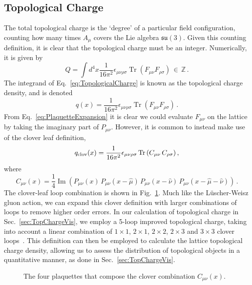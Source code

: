 \subsection{Topological Charge}\label{sec:TopQ}
The total topological charge is the `degree' of a particular field configuration, counting how many times $A_\mu$ covers the Lie algebra $\mathfrak{su}(3)$. Given this counting definition, it is clear that the topological charge must be an integer. Numerically, it is given by~\cite{Alexandrou:2017hqw}
%
\begin{equation}
Q = \int d^4x \frac { 1 } { 16 \pi ^ { 2 } } \epsilon _ { \mu \nu \rho \sigma } \operatorname { Tr } \left( F _ { \mu \nu } F _ { \rho \sigma } \right)\, \in\, \mathbb{Z} \, .
\label{eq:TopologicalCharge}
\end{equation} 
The integrand of Eq.~\eqref{eq:TopologicalCharge} is known as the topological charge density, and is denoted
%
\begin{equation}
q(x) = \frac { 1 } { 16 \pi ^ { 2 } } \epsilon _ { \mu \nu \rho \sigma } \operatorname { Tr } \left( F _ { \mu \nu } F _ { \rho \sigma } \right)\, .
\end{equation}
%
From Eq.~\eqref{eq:PlaquetteExpansion} it is clear we could evaluate $F_{\mu\nu}$ on the lattice by taking the imaginary part of $P_{\mu\nu}$. However, it is common to instead make use of the clover leaf definition,
%
\begin{equation}
q_\text{clov}(x) = \frac{1}{16\pi^2} \epsilon _ { \mu \nu \rho \sigma } \operatorname{Tr}\left(C_{\mu\nu} \, C_{\rho\sigma}\right),
\end{equation}
%
where
\begin{equation}
C_{\mu\nu}(x) = \frac{1}{4} \operatorname{Im}\left(P_{\mu\nu}(x) \, P_{\mu\nu}(x-\hat{\mu}) \, P_{\mu\nu}(x - \hat{\nu}) \, P_{\mu\nu}(x - \hat{\mu} - \hat{\nu})\right)\, .
\end{equation}
%
The clover-leaf loop combination is shown in Fig.~\ref{fig:Clover}. Much like the L\"uscher-Weisz gluon action, we can expand this clover definition with larger combinations of loops to remove higher order errors. In our calculation of topological charge in Sec.~\ref{sec:TopChargeVis}, we employ a 5-loop improved topological charge, taking into account a linear combination of $1\times 1$, $2\times 1$, $2\times 2$, $2\times 3$ and $3\times 3$ clover loops~\cite{BilsonThompson:2001ca}. This definition can then be employed to calculate the lattice topological charge density, allowing us to assess the distribution of topological objects in a quantitative manner, as done in Sec.~\ref{sec:TopChargeVis}.
%
\begin{figure}[H]
\centering
\scalebox{0.9}{}
\caption{\label{fig:Clover}The four plaquettes that compose the clover combination $C_{\mu\nu}(x)$.}
\end{figure}
%

